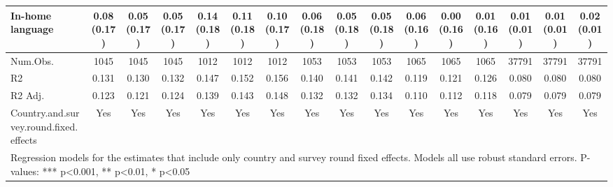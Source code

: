 \begin{table}[H]
\begin{tabular}[t]{lccccccccccccccc}
In-home language & \num{0.08} (\num{0.17}) & \num{0.05} (\num{0.17}) & \num{0.05} (\num{0.17}) & \num{0.14} (\num{0.18}) & \num{0.11} (\num{0.18}) & \num{0.10} (\num{0.17}) & \num{0.06} (\num{0.18}) & \num{0.05} (\num{0.18}) & \num{0.05} (\num{0.18}) & \num{0.06} (\num{0.16}) & \num{0.00} (\num{0.16}) & \num{0.01} (\num{0.16}) & \num{0.01} (\num{0.01}) & \num{0.01} (\num{0.01}) & \num{0.02} (\num{0.01})\\
\midrule
Num.Obs. & \num{1045} & \num{1045} & \num{1045} & \num{1012} & \num{1012} & \num{1012} & \num{1053} & \num{1053} & \num{1053} & \num{1065} & \num{1065} & \num{1065} & \num{37791} & \num{37791} & \num{37791}\\
R2 & \num{0.131} & \num{0.130} & \num{0.132} & \num{0.147} & \num{0.152} & \num{0.156} & \num{0.140} & \num{0.141} & \num{0.142} & \num{0.119} & \num{0.121} & \num{0.126} & \num{0.080} & \num{0.080} & \num{0.080}\\
R2 Adj. & \num{0.123} & \num{0.121} & \num{0.124} & \num{0.139} & \num{0.143} & \num{0.148} & \num{0.132} & \num{0.132} & \num{0.134} & \num{0.110} & \num{0.112} & \num{0.118} & \num{0.079} & \num{0.079} & \num{0.079}\\
Country.and.survey.round.fixed.effects & Yes & Yes & Yes & Yes & Yes & Yes & Yes & Yes & Yes & Yes & Yes & Yes & Yes & Yes & Yes\\
\bottomrule
\multicolumn{16}{l}{\rule{0pt}{1em}Regression models for the estimates that include only country and survey round fixed effects. Models all use robust standard errors. P-values: *** p<0.001, ** p<0.01, * p<0.05}\\
\end{tabular}
\end{table}
